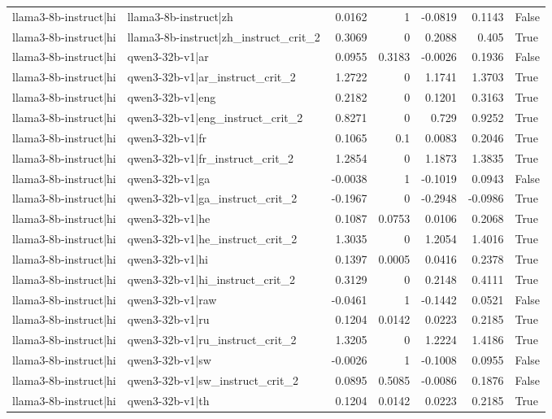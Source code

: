 \begin{table}
\begin{tabular}{l l r r r r l}
llama3-8b-instruct|hi & llama3-8b-instruct|zh & 0.0162 & 1 & -0.0819 & 0.1143 & False \\
llama3-8b-instruct|hi & llama3-8b-instruct|zh_instruct_crit_2 & 0.3069 & 0 & 0.2088 & 0.405 & True \\
llama3-8b-instruct|hi & qwen3-32b-v1|ar & 0.0955 & 0.3183 & -0.0026 & 0.1936 & False \\
llama3-8b-instruct|hi & qwen3-32b-v1|ar_instruct_crit_2 & 1.2722 & 0 & 1.1741 & 1.3703 & True \\
llama3-8b-instruct|hi & qwen3-32b-v1|eng & 0.2182 & 0 & 0.1201 & 0.3163 & True \\
llama3-8b-instruct|hi & qwen3-32b-v1|eng_instruct_crit_2 & 0.8271 & 0 & 0.729 & 0.9252 & True \\
llama3-8b-instruct|hi & qwen3-32b-v1|fr & 0.1065 & 0.1 & 0.0083 & 0.2046 & True \\
llama3-8b-instruct|hi & qwen3-32b-v1|fr_instruct_crit_2 & 1.2854 & 0 & 1.1873 & 1.3835 & True \\
llama3-8b-instruct|hi & qwen3-32b-v1|ga & -0.0038 & 1 & -0.1019 & 0.0943 & False \\
llama3-8b-instruct|hi & qwen3-32b-v1|ga_instruct_crit_2 & -0.1967 & 0 & -0.2948 & -0.0986 & True \\
llama3-8b-instruct|hi & qwen3-32b-v1|he & 0.1087 & 0.0753 & 0.0106 & 0.2068 & True \\
llama3-8b-instruct|hi & qwen3-32b-v1|he_instruct_crit_2 & 1.3035 & 0 & 1.2054 & 1.4016 & True \\
llama3-8b-instruct|hi & qwen3-32b-v1|hi & 0.1397 & 0.0005 & 0.0416 & 0.2378 & True \\
llama3-8b-instruct|hi & qwen3-32b-v1|hi_instruct_crit_2 & 0.3129 & 0 & 0.2148 & 0.4111 & True \\
llama3-8b-instruct|hi & qwen3-32b-v1|raw & -0.0461 & 1 & -0.1442 & 0.0521 & False \\
llama3-8b-instruct|hi & qwen3-32b-v1|ru & 0.1204 & 0.0142 & 0.0223 & 0.2185 & True \\
llama3-8b-instruct|hi & qwen3-32b-v1|ru_instruct_crit_2 & 1.3205 & 0 & 1.2224 & 1.4186 & True \\
llama3-8b-instruct|hi & qwen3-32b-v1|sw & -0.0026 & 1 & -0.1008 & 0.0955 & False \\
llama3-8b-instruct|hi & qwen3-32b-v1|sw_instruct_crit_2 & 0.0895 & 0.5085 & -0.0086 & 0.1876 & False \\
llama3-8b-instruct|hi & qwen3-32b-v1|th & 0.1204 & 0.0142 & 0.0223 & 0.2185 & True \\

\end{tabular}
\end{table}
